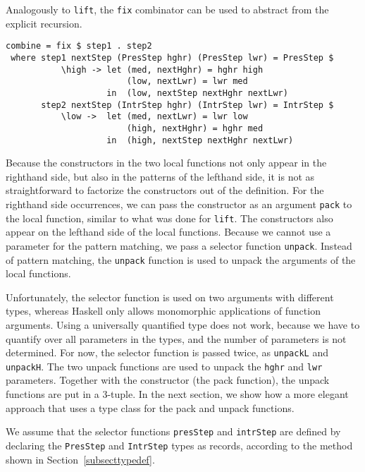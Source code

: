 Analogously to \texttt{lift}, the \texttt{fix} combinator can be used to abstract from the explicit recursion.

\begin{small}
\begin{verbatim}
combine = fix $ step1 . step2
 where step1 nextStep (PresStep hghr) (PresStep lwr) = PresStep $
           \high -> let (med, nextHghr) = hghr high
                        (low, nextLwr) = lwr med
                    in  (low, nextStep nextHghr nextLwr)
       step2 nextStep (IntrStep hghr) (IntrStep lwr) = IntrStep $
           \low ->  let (med, nextLwr) = lwr low
                        (high, nextHghr) = hghr med
                    in  (high, nextStep nextHghr nextLwr)
\end{verbatim}
\end{small}

Because the constructors in the two local functions not only appear in the righthand side, but also in the patterns of the lefthand side, it is not as straightforward to factorize the constructors out of the definition. For the righthand side occurrences, we can pass the constructor as an argument \texttt{pack} to the local function, similar to what was done for \texttt{lift}. The constructors also appear on the lefthand side of the local functions. Because we cannot use a parameter for the pattern matching, we pass a selector function \texttt{unpack}. Instead of pattern matching, the \texttt{unpack} function is used to unpack the arguments of the local functions.

Unfortunately, the selector function is used on two arguments with different types, whereas Haskell only allows monomorphic applications of function arguments. Using a universally quantified type does not work, because we have to quantify over all parameters in the types, and the number of parameters is not determined. For now, the selector function is passed twice, as \texttt{unpackL} and \texttt{unpackH}. The two unpack functions are used to unpack the \texttt{hghr} and \texttt{lwr} parameters. Together with the constructor (the pack function), the unpack functions are put in a 3-tuple. In the next section, we show how a more elegant approach that uses a type class for the pack and unpack functions.

We assume that the selector functions \texttt{presStep} and \texttt{intrStep} are defined by declaring the \texttt{PresStep} and \texttt{IntrStep} types as records, according to the method shown in Section~\ref{subsecttypedef}.

